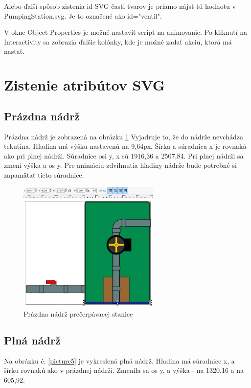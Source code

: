 Alebo ďalší spôsob zistenia id SVG časti tvarov je priamo nájsť tú hodnotu v PumpingStation.svg. Je to označené ako id="ventil".

V okne Object Properties je možné nastaviť script na animovanie. Po kliknutí na Interactivity sa zobrazia ďalšie kolónky, kde je možné zadať akciu, ktorá má nastať.  


\section{Zistenie atribútov SVG}

\subsection{Prázdna nádrž}
Prázdna nádrž je zobrazená na obrázku \ref{picture6}
Vyjadruje to, že do nádrže nevchádza tekutina. Hladina má výšku nastavenú na 9,64px. Šírka a súradnica x je rovnaká ako pri plnej nádrži. Súradnice osi y, x sú 1916,36 a 2507,84. Pri plnej nádrži sa zmení výška a os y. Pre animáciu zdvihnutia hladiny nádrže bude potrebné si zapamätať tieto súradnice. 
\begin{figure}[h]
	\begin{center}
		\includegraphics [height=6.5cm]  {obrazky/obr6.png}
		\caption{Prázdna nádrž prečerpávacej stanice}
		\label{picture6}
	\end{center}
\end{figure}


\subsection{Plná nádrž}
Na obrázku č. \ref{picture5} je vykreslená plná nádrž. Hladina má súradnice x, a šírku rovnakú ako v prázdnej nádrži. Zmenila sa os y, a výška - na 1320,16 a na 605,92. 

